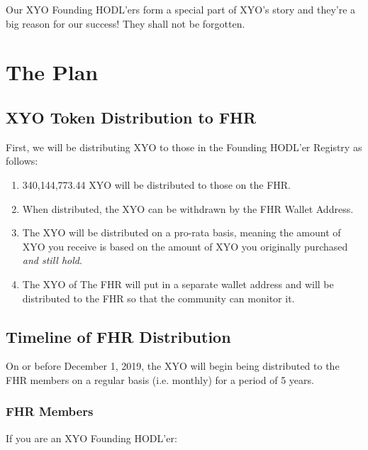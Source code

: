 \documentclass{article}
\begin{document}
Our XYO Founding HODL'ers form a special part of XYO's story and they're a big reason for our success! They shall not be forgotten.

\section{The Plan}

\subsection{XYO Token Distribution to FHR}

First, we will be distributing XYO to those in the Founding HODL'er Registry as follows:

\begin{enumerate}
\item 340,144,773.44 XYO will be distributed to those on the FHR. 
\item When distributed, the XYO can be withdrawn by the FHR Wallet Address.
\item The XYO will be distributed on a pro-rata basis, meaning the amount of XYO you receive is based on the amount of XYO you originally purchased \textit{and still hold}.
\item The XYO of The FHR will put in a separate wallet address and will be distributed to the FHR so that the community can monitor it.
\end{enumerate}

\subsection{Timeline of FHR Distribution}

On or before December 1, 2019, the XYO will begin being distributed to the FHR members on a regular basis (i.e. monthly) for a period of 5 years.
\subsubsection{FHR Members}

If you are an XYO Founding HODL'er:
\end{document}
